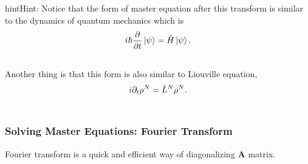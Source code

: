 \documentclass[letterpaper,10pt,english]{sphinxmanual}
\newcommand{\ket}[1]{\left| #1\right\rangle}
\begin{document}
\begin{notice}{hint}{Hint:}
Notice that the form of master equation after this transform is similar to the dynamics of quantum mechanics which is
\begin{gather}
\begin{split}i\hbar \frac{\partial }{\partial t} \ket{\psi} = \hat H \ket{\psi}.\end{split}\notag\\\begin{split}\end{split}\notag
\end{gather}
Another thing is that this form is also similar to Liouville equation,
\begin{gather}
\begin{split}i\partial_t \rho^N = \hat L^N \rho^N .\end{split}\notag\\\begin{split}\end{split}\notag
\end{gather}\end{notice}


\subsubsection{Solving Master Equations: Fourier Transform}
\label{nonequilibrium/week10:solving-master-equations-fourier-transform}
Fourier transform is a quick and efficient way of diagonalizing $\mathbf A$ matrix.
\end{document}
